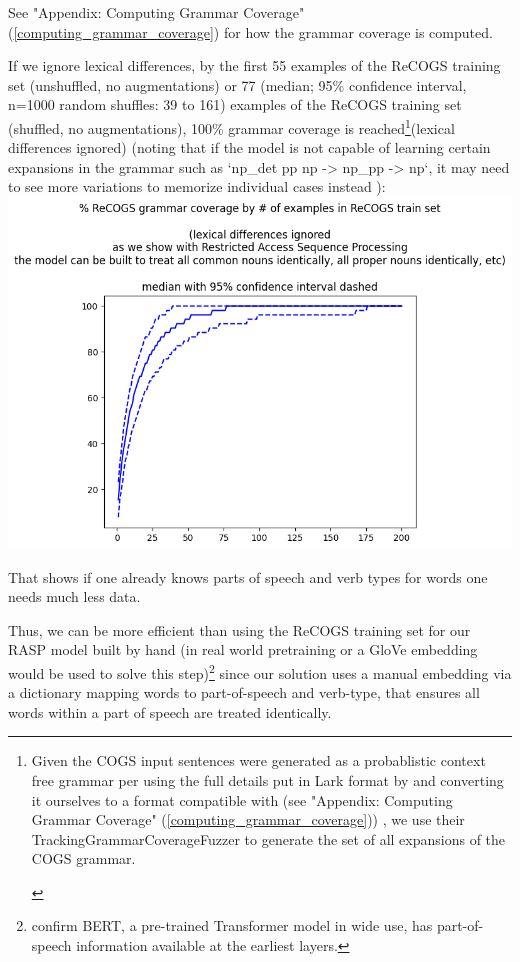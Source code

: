 \documentclass[11pt]{article}
\begin{document}
See "Appendix: Computing Grammar Coverage" (\ref{computing_grammar_coverage}) for how the grammar coverage is computed.

If we ignore lexical differences, by the first 55 examples of the ReCOGS training set (unshuffled, no augmentations) or 77 (median; 95\% confidence interval, n=1000 random shuffles: 39 to 161) examples of the ReCOGS training set (shuffled, no augmentations), 100\% grammar coverage is reached\footnote{\begin{footnotesize}Given the COGS input sentences were generated as a probablistic context free grammar per \cite{KimLinzen2020}
using the full details put in Lark format by \cite{klinger2024compositionalprogramgenerationfewshot}
and converting it ourselves to a format compatible with \cite{fuzzingbook2023:GrammarCoverageFuzzer} (see "Appendix: Computing Grammar Coverage" (\ref{computing_grammar_coverage})) , we use their TrackingGrammarCoverageFuzzer to generate the set of all expansions of the COGS grammar.
\end{footnotesize}
}(lexical differences ignored) \cite{fuzzingbook2023:GrammarCoverageFuzzer} (noting that if the model is not capable of learning certain expansions in the grammar such as `np\_det pp np -> np\_pp -> np`, it may need to see more variations to memorize individual cases instead ):
\includegraphics[scale=0.38]{grammar_coverage_by_number_of_recogs_training_examples_lexical_differences_ignored.png}

That shows if one already knows parts of speech and verb types for words one needs much less data.

Thus, we can be more efficient than using the ReCOGS training set for our RASP model built by hand (in real world pretraining or a GloVe embedding would be used to solve this step)\footnote{\cite{tenney2019bertrediscoversclassicalnlp} confirm BERT, a pre-trained Transformer model in wide use, has part-of-speech information available at the earliest layers.}
 since our solution uses a manual embedding via a dictionary mapping words to part-of-speech and verb-type, that ensures all words within a part of speech are treated identically.
\end{document}
